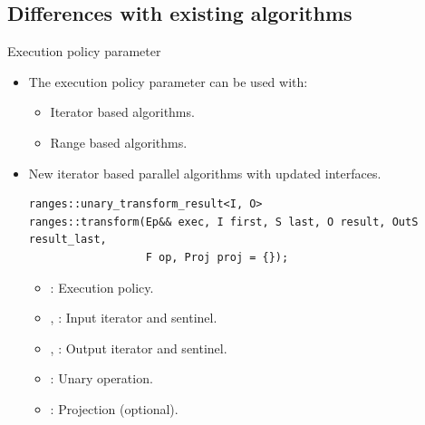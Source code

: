 \subsection{Differences with existing algorithms}

\begin{frame}[t,fragile]{Execution policy parameter}
\begin{itemize}

  \item The execution policy parameter can be used with:
     \begin{itemize}
        \item Iterator based algorithms.
        \item Range based algorithms.
    \end{itemize}
    
  \item New iterator based parallel algorithms with updated interfaces.

\begin{lstlisting}
ranges::unary_transform_result<I, O>
ranges::transform(Ep&& exec, I first, S last, O result, OutS result_last,
                  F op, Proj proj = {});
\end{lstlisting}

  \begin{itemize}
    \item {}: Execution policy.
    \item {}, : Input iterator and sentinel.
    \item {}, : Output iterator and sentinel.
    \item {}: Unary operation.
    \item {}: Projection (optional).
  \end{itemize}
  
\end{itemize}
\end{frame}

